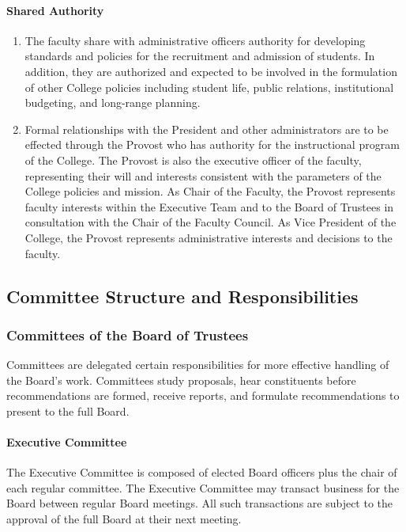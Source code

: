			\paragraph{Shared Authority}
				\begin{enumerate}
					\item{ The faculty share with administrative officers authority for developing standards and policies
						for the recruitment and admission of students. In addition, they are authorized and expected to be
						involved in the formulation of other College policies including student life, public relations,
						institutional budgeting, and long-range planning.}
					\item{ Formal relationships with the President and other administrators are to be effected through the
						Provost who has authority for the instructional program of the College.  The Provost is also the
						executive officer of the faculty, representing their will and interests consistent with the
						parameters of the College policies and mission.  As Chair of the Faculty, the Provost represents
						faculty interests within the Executive Team and to the Board of Trustees in consultation with the
						Chair of the Faculty Council.  As Vice President of the College, the Provost represents
						administrative interests and decisions to the faculty.}
				\end{enumerate}


	\subsection{Committee Structure and Responsibilities}
		\subsubsection{Committees of the Board of Trustees}
			Committees are delegated certain responsibilities for more effective handling of the Board's work.  Committees study proposals, hear constituents before recommendations are formed, receive reports, and formulate recommendations to present to the full Board.
			\paragraph{Executive Committee}
				The Executive Committee is composed of elected Board officers plus the chair of each regular committee.  The Executive Committee may transact business for the Board between regular Board meetings.  All such transactions are subject to the approval of the full Board at their next meeting.
